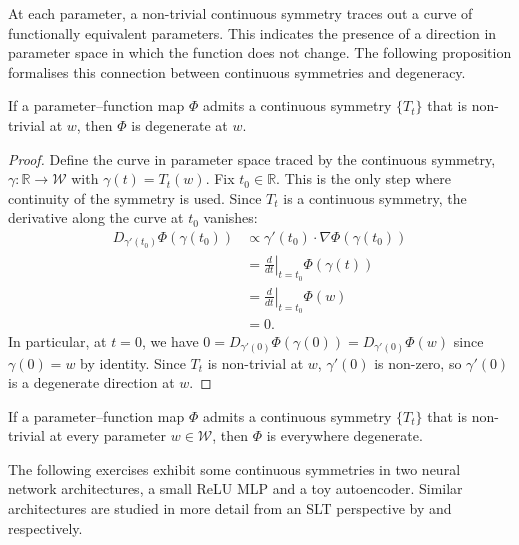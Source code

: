 \documentclass[11pt]{article}
\newcommand{\R}{\mathbb{R}}
\newcommand{\W}{\mathcal{W}}
\begin{document}
At each parameter, a non-trivial continuous symmetry traces out a curve of
functionally equivalent parameters. This indicates the presence of a direction
in parameter space in which the function does not change. The following
proposition formalises this connection between continuous symmetries and
degeneracy.

\begin{proposition}
\label{prop:symmetry-degeneracy}
    If a parameter--function map $\Phi$ admits a continuous symmetry $\{T_t\}$
    that is non-trivial at $w$, then $\Phi$ is degenerate at $w$.
\end{proposition}

\begin{proof}
    Define the curve in parameter space traced by the continuous symmetry,
    $\gamma : \R \to \W$ with $\gamma(t) = T_t(w)$.
    Fix $t_0 \in \R$. This is the only step where continuity of the symmetry
    is used. Since $T_t$ is a continuous symmetry, the derivative
    along the curve at $t_0$ vanishes:
    \begin{align*}
        D_{\gamma'(t_0)} \Phi(\gamma(t_0))
        &\propto \gamma'(t_0) \cdot \nabla \Phi(\gamma(t_0))
    \\  &= \left.\frac{d}{dt}\right|_{t=t_0} \Phi(\gamma(t))
            \tag{chain rule for $\Phi \circ \gamma$}
    \\  &= \left.\frac{d}{dt}\right|_{t=t_0} \Phi(w)
            \tag{symmetry, $\Phi \circ T_t = \Phi$}
    \\  &= 0.
            \tag{$\Phi(w)$ is constant in $t$}
    \end{align*}
    In particular, at $t=0$, we have
        $0 = D_{\gamma'(0)} \Phi(\gamma(0)) = D_{\gamma'(0)} \Phi(w)$
    since $\gamma(0) = w$ by identity. Since $T_t$ is non-trivial at $w$,
    $\gamma'(0)$ is non-zero, so $\gamma'(0)$ is a degenerate direction at $w$.
\end{proof}

\begin{corollary}
    If a parameter--function map $\Phi$ admits a continuous symmetry $\{T_t\}$
    that is non-trivial at every parameter $w \in \W$, then $\Phi$ is
    everywhere degenerate.
\end{corollary}

The following exercises exhibit some continuous symmetries in two neural
network architectures, a small ReLU MLP and a toy autoencoder. Similar
architectures are studied in more detail from an SLT perspective by
\citet{Carroll2021} and \citet{Chen+2023} respectively.
\end{document}
